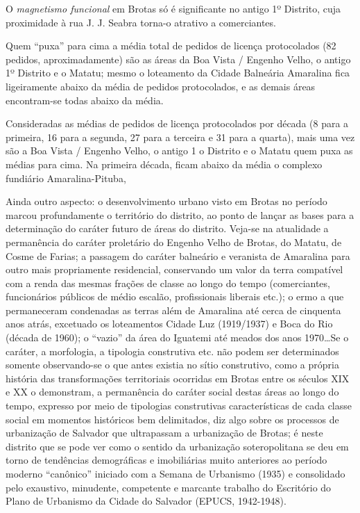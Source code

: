 O \textit{magnetismo funcional} em Brotas só é significante no antigo 1º Distrito, cuja proximidade à rua J. J. Seabra torna-o atrativo a comerciantes.

Quem ``puxa'' para cima a média total de pedidos de licença protocolados (82 pedidos, aproximadamente) são as áreas da Boa Vista / Engenho Velho, o antigo 1º Distrito e o Matatu; mesmo o loteamento da Cidade Balneária Amaralina fica ligeiramente abaixo da média de pedidos protocolados, e as demais áreas encontram-se todas abaixo da média.

Consideradas as médias de pedidos de licença protocolados por década (8 para a primeira, 16 para a segunda, 27 para a terceira e 31 para a quarta), mais uma vez são a Boa Vista / Engenho Velho, o antigo 1 o Distrito e o Matatu quem puxa as médias para cima. Na primeira década, ficam abaixo da média o complexo fundiário Amaralina-Pituba, 

Ainda outro aspecto: o desenvolvimento urbano visto em Brotas no período marcou profundamente o território do distrito, ao ponto de lançar as bases para a determinação do caráter futuro de áreas do distrito. Veja-se na atualidade a permanência do caráter proletário do Engenho Velho de Brotas, do Matatu, de Cosme de Farias; a passagem do caráter balneário e veranista de Amaralina para outro mais propriamente residencial, conservando um valor da terra compatível com a renda das mesmas frações de classe ao longo do tempo (comerciantes, funcionários públicos de médio escalão, profissionais liberais etc.); o ermo a que permaneceram condenadas as terras além de Amaralina até cerca de cinquenta anos atrás, excetuado os loteamentos Cidade Luz (1919/1937) e Boca do Rio (década de 1960); o ``vazio'' da área do Iguatemi até meados dos anos 1970\dots Se o caráter, a morfologia, a tipologia construtiva etc. não podem ser determinados somente observando-se o que antes existia no sítio construtivo, como a própria história das transformações territoriais ocorridas em Brotas entre os séculos XIX e XX o demonstram, a permanência do caráter social destas áreas ao longo do tempo, expresso por meio de tipologias construtivas características de cada classe social em momentos históricos bem delimitados, diz algo sobre os processos de urbanização de Salvador que ultrapassam a urbanização de Brotas; é neste distrito que se pode ver como o sentido da urbanização soteropolitana se deu em torno de tendências demográficas e imobiliárias muito anteriores ao período moderno ``canônico'' iniciado com a Semana de Urbanismo (1935) e consolidado pelo exaustivo, minudente, competente e marcante trabalho do Escritório do Plano de Urbanismo da Cidade do Salvador (EPUCS, 1942-1948).


